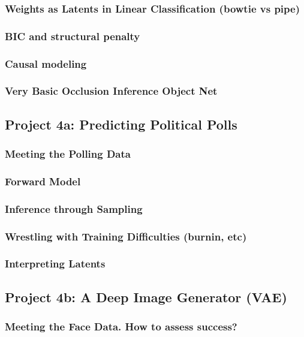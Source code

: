 \documentclass[12pt]{article}
\begin{document}
      \subsubsection*{Weights as Latents in Linear Classification (bowtie vs pipe)}
      \subsubsection*{BIC and structural penalty}
      \subsubsection*{Causal modeling}
      \subsubsection*{Very Basic Occlusion Inference Object Net}
    \newpage

    \subsection*{Project 4a: Predicting Political Polls}
      \subsubsection*{Meeting the Polling Data}
      \subsubsection*{Forward Model}
      \subsubsection*{Inference through Sampling}
      \subsubsection*{Wrestling with Training Difficulties (burnin, etc)}
      \subsubsection*{Interpreting Latents}
    \newpage


    \subsection*{Project 4b: A Deep Image Generator (VAE)}
      \subsubsection*{Meeting the Face Data.  How to assess success?} %
\end{document}
